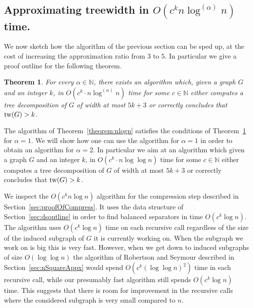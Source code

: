 \documentclass[a4paper,11pt]{article}
\newtheorem{theorem}{Theorem}
\theoremstyle{definition}
\theoremstyle{remark}
\newcommand{\depth}{\alpha}
\begin{document}
\subsection{Approximating treewidth in $O(c^kn \log^{(\depth)}n)$
  time.}
We now sketch how the algorithm of the previous section can be sped
up, at the cost of increasing the approximation ratio from $3$ to $5$.
In particular we give a proof outline for the following theorem.
\begin{theorem}\label{theorem:nlogin}
  For every $\depth\in \mathbb{N}$, there exists an algorithm which,
  given a graph $G$ and an integer $k$, in $O(c^k\cdot n
  \log^{(\depth)} n)$ time for some $c \in \mathbb{N}$ either computes a
  tree decomposition of $G$ of width at most $5k+3$ or correctly
  concludes that $\mathrm{tw}(G) > k$.
\end{theorem}
The algorithm of Theorem~\ref{theorem:nlogn} satisfies the conditions
of Theorem~\ref{theorem:nlogin} for $\depth{} = 1$.  We will show how
one can use the algorithm for $\depth{} = 1$ in order to obtain an
algorithm for $\depth{} = 2$.  In particular we aim at an algorithm
which given a graph $G$ and an integer $k$, in $O(c^k\cdot n \log \log
n)$ time for some $c \in \mathbb{N}$ either computes a tree
decomposition of $G$ of width at most $5k+3$ or correctly concludes
that $\mathrm{tw}(G) > k$.

We inspect the $O(c^kn \log n)$ algorithm for the compression step
described in Section~\ref{sec:proofOfCompress}.  It uses the data
structure of Section~\ref{sec:dsoutline} in order to find balanced
separators in time $O(c^k \log n)$.  The algorithm uses $O(c^k \log
n)$ time on each recursive call regardless of the size of the induced
subgraph of $G$ it is currently working on.  When the subgraph we work
on is big this is very fast.  However, when we get down to induced
subgraphs of size $O(\log \log n)$ the algorithm of Robertson and
Seymour described in Section~\ref{sec:nSquareAppx} would spend $O(c^k
(\log \log n)^2)$ time in each recursive call, while our presumably
fast algorithm still spends $O(c^k \log n)$ time.  This suggests that
there is room for improvement in the recursive calls where the
considered subgraph is very small compared to $n$.
\end{document}
